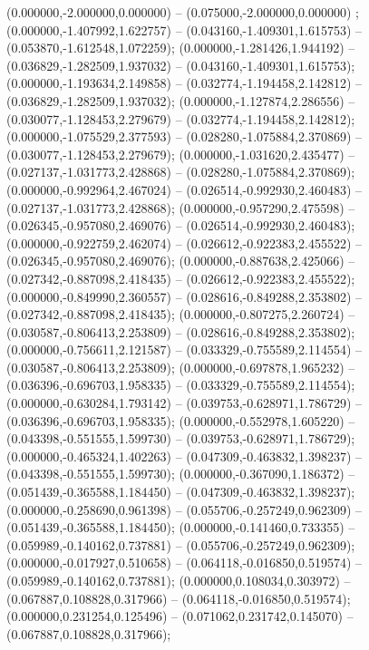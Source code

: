  (0.000000,-2.000000,0.000000) -- (0.075000,-2.000000,0.000000) ;
 (0.000000,-1.407992,1.622757) -- (0.043160,-1.409301,1.615753) -- (0.053870,-1.612548,1.072259);
 (0.000000,-1.281426,1.944192) -- (0.036829,-1.282509,1.937032) -- (0.043160,-1.409301,1.615753);
 (0.000000,-1.193634,2.149858) -- (0.032774,-1.194458,2.142812) -- (0.036829,-1.282509,1.937032);
 (0.000000,-1.127874,2.286556) -- (0.030077,-1.128453,2.279679) -- (0.032774,-1.194458,2.142812);
 (0.000000,-1.075529,2.377593) -- (0.028280,-1.075884,2.370869) -- (0.030077,-1.128453,2.279679);
 (0.000000,-1.031620,2.435477) -- (0.027137,-1.031773,2.428868) -- (0.028280,-1.075884,2.370869);
 (0.000000,-0.992964,2.467024) -- (0.026514,-0.992930,2.460483) -- (0.027137,-1.031773,2.428868);
 (0.000000,-0.957290,2.475598) -- (0.026345,-0.957080,2.469076) -- (0.026514,-0.992930,2.460483);
 (0.000000,-0.922759,2.462074) -- (0.026612,-0.922383,2.455522) -- (0.026345,-0.957080,2.469076);
 (0.000000,-0.887638,2.425066) -- (0.027342,-0.887098,2.418435) -- (0.026612,-0.922383,2.455522);
 (0.000000,-0.849990,2.360557) -- (0.028616,-0.849288,2.353802) -- (0.027342,-0.887098,2.418435);
 (0.000000,-0.807275,2.260724) -- (0.030587,-0.806413,2.253809) -- (0.028616,-0.849288,2.353802);
 (0.000000,-0.756611,2.121587) -- (0.033329,-0.755589,2.114554) -- (0.030587,-0.806413,2.253809);
 (0.000000,-0.697878,1.965232) -- (0.036396,-0.696703,1.958335) -- (0.033329,-0.755589,2.114554);
 (0.000000,-0.630284,1.793142) -- (0.039753,-0.628971,1.786729) -- (0.036396,-0.696703,1.958335);
 (0.000000,-0.552978,1.605220) -- (0.043398,-0.551555,1.599730) -- (0.039753,-0.628971,1.786729);
 (0.000000,-0.465324,1.402263) -- (0.047309,-0.463832,1.398237) -- (0.043398,-0.551555,1.599730);
 (0.000000,-0.367090,1.186372) -- (0.051439,-0.365588,1.184450) -- (0.047309,-0.463832,1.398237);
 (0.000000,-0.258690,0.961398) -- (0.055706,-0.257249,0.962309) -- (0.051439,-0.365588,1.184450);
 (0.000000,-0.141460,0.733355) -- (0.059989,-0.140162,0.737881) -- (0.055706,-0.257249,0.962309);
 (0.000000,-0.017927,0.510658) -- (0.064118,-0.016850,0.519574) -- (0.059989,-0.140162,0.737881);
 (0.000000,0.108034,0.303972) -- (0.067887,0.108828,0.317966) -- (0.064118,-0.016850,0.519574);
 (0.000000,0.231254,0.125496) -- (0.071062,0.231742,0.145070) -- (0.067887,0.108828,0.317966);
